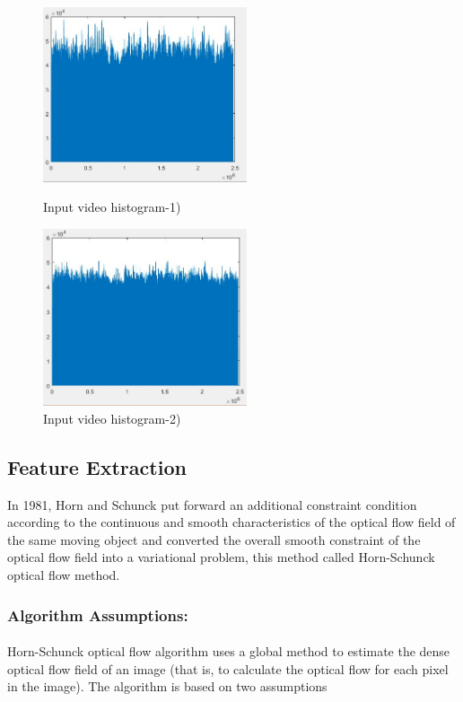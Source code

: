 \documentclass[runningheads,a4paper]{llncs}
\begin{document}
		\begin{figure}[htbp]
		\centering
		\begin{minipage}[t]{0.49\textwidth}
		\centering
		\includegraphics[width=6cm]{his-3_x.JPG}
		\caption{Input video histogram-1)}
		\label{fig:his-11}
		\end{minipage}
		\begin{minipage}[t]{0.49\textwidth}
		\centering
		\includegraphics[width=6cm]{his-3_y.JPG}
		\caption{Input video histogram-2)}
		\label{fig:his-12}
		\end{minipage}
		\end{figure}

	\subsection{Feature Extraction}

		In 1981, Horn and Schunck put forward an additional constraint condition according to the continuous and smooth characteristics of the optical flow field of the same moving object and converted the overall smooth constraint of the optical flow field into a variational problem, this method called Horn-Schunck optical flow method.\cite{3}\\

		\subsubsection{Algorithm Assumptions:}
			\paragraph{}
			Horn-Schunck optical flow algorithm uses a global method to estimate the dense optical flow field of an image (that is, to calculate the optical flow for each pixel in the image). The algorithm is based on two assumptions\cite{4}\\
\end{document}
